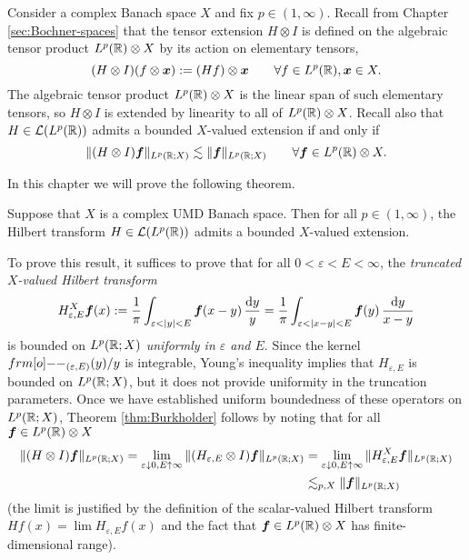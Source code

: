 Consider a complex Banach space $X$ and fix $p \in (1,\infty)$.
Recall from Chapter \ref{sec:Bochner-spaces} that the tensor extension $H \otimes I$ is defined on the algebraic tensor product $L^p(\mathbb{R}) \otimes X$ by its action on elementary tensors,
\begin{equation*}
  (H \otimes I)(f \otimes \bm{x}) := (Hf) \otimes \bm{x} \qquad \forall f \in L^p(\mathbb{R}), \bm{x} \in X.
\end{equation*}
The algebraic tensor product $L^p(\mathbb{R}) \otimes X$ is the linear span of such elementary tensors, so $H \otimes I$ is extended by linearity to all of $L^p(\mathbb{R}) \otimes X$.
Recall also that $H \in \mathcal{L}(L^p(\mathbb{R}))$ admits a bounded $X$-valued extension if and only if
\begin{equation*}
  \|(H \otimes I)\bm{f}\|_{L^p(\mathbb{R};X)} \lesssim \|\bm{f}\|_{L^p(\mathbb{R};X)} \qquad \forall \bm{f} \in L^p(\mathbb{R}) \otimes X.
\end{equation*}

In this chapter we will prove the following theorem.

\begin{thm}[Burkholder]\label{thm:Burkholder}
  Suppose that $X$ is a complex UMD Banach space.
  Then for all $p \in (1,\infty)$, the Hilbert transform $H \in \mathcal{L}(L^p(\mathbb{R}))$ admits a bounded $X$-valued extension.
\end{thm}

To prove this result, it suffices to prove that for all $0 < \varepsilon < E < \infty$, the \emph{truncated $X$-valued Hilbert transform}
\begin{equation*}
  H_{\varepsilon,E}^{X} \bm{f}(x) :=  \frac{1}{\pi} \int_{\varepsilon < |y| < E} \bm{f}(x-y) \, \frac{\mathrm{d} y}{y} = \frac{1}{\pi} \int_{\varepsilon < |x-y| < E} \bm{f}(y) \, \frac{\mathrm{d} y}{x-y}
\end{equation*}
is bounded on $L^p(\mathbb{R};X)$ \emph{uniformly in $\varepsilon$ and $E$}.
Since the kernel $\1_{(\varepsilon,E)}(y)/y$ is integrable, Young's inequality implies that $H_{\varepsilon,E}$ is bounded on $L^p(\mathbb{R};X)$, but it does not provide uniformity in the truncation parameters.
Once we have established uniform boundedness of these operators on $L^p(\mathbb{R};X)$, Theorem \ref{thm:Burkholder} follows by noting that for all $\bm{f} \in L^p(\mathbb{R}) \otimes X$
\begin{equation*}
  \begin{aligned}
    \|(H \otimes I)\bm{f}\|_{L^p(\mathbb{R};X)}
    = \lim_{\varepsilon \downarrow 0, E \uparrow \infty} \|(H_{\varepsilon,E} \otimes I)\bm{f}\|_{L^p(\mathbb{R};X)}
    &= \lim_{\varepsilon \downarrow 0, E \uparrow \infty} \|H_{\varepsilon,E}^{X}\bm{f}\|_{L^p(\mathbb{R};X)} \\
    &\lesssim_{p,X} \|\bm{f}\|_{L^p(\mathbb{R};X)}
  \end{aligned}
\end{equation*}
(the limit is justified by the definition of the scalar-valued Hilbert transform $Hf(x) = \lim H_{\varepsilon, E}f(x)$ and the fact that $\bm{f} \in L^p(\mathbb{R}) \otimes X$ has finite-dimensional range).

